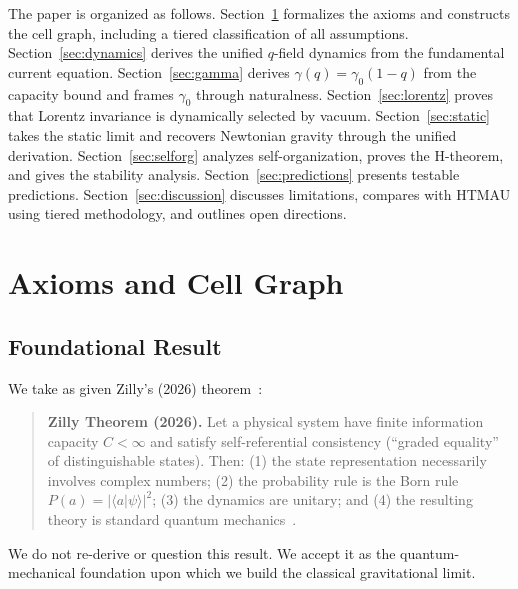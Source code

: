 \documentclass[aps,prd,twocolumn,showpacs,superscriptaddress,preprintnumbers]{revtex4-2}
\begin{document}
The paper is organized as follows.
Section~\ref{sec:axioms} formalizes the axioms and constructs the cell graph, including a tiered classification of all assumptions.
Section~\ref{sec:dynamics} derives the unified $q$-field dynamics from the fundamental current equation.
Section~\ref{sec:gamma} derives $\gamma(q)=\gamma_0(1-q)$ from the capacity bound and frames $\gamma_0$ through naturalness.
Section~\ref{sec:lorentz} proves that Lorentz invariance is dynamically selected by vacuum.
Section~\ref{sec:static} takes the static limit and recovers Newtonian gravity through the unified derivation.
Section~\ref{sec:selforg} analyzes self-organization, proves the H-theorem, and gives the stability analysis.
Section~\ref{sec:predictions} presents testable predictions.
Section~\ref{sec:discussion} discusses limitations, compares with HTMAU using tiered methodology, and outlines open directions.

\section{Axioms and Cell Graph}
\label{sec:axioms}

\subsection{Foundational Result}

We take as given Zilly's (2026) theorem~\cite{Zilly:2026}:

\begin{quote}
\textbf{Zilly Theorem (2026).} Let a physical system have finite information capacity $C<\infty$ and satisfy self-referential consistency (``graded equality'' of distinguishable states). Then: (1) the state representation necessarily involves complex numbers; (2) the probability rule is the Born rule $P(a)=|\langle a|\psi\rangle|^2$; (3) the dynamics are unitary; and (4) the resulting theory is standard quantum mechanics~\cite{Zilly:2026}.
\end{quote}

We do not re-derive or question this result.
We accept it as the quantum-mechanical foundation upon which we build the classical gravitational limit.
\end{document}
